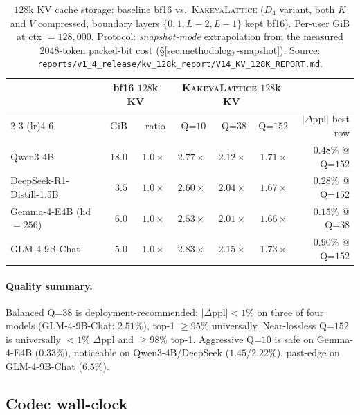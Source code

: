 \documentclass[10pt,a4paper]{article}
\theoremstyle{definition}
\theoremstyle{plain}
\newcommand{\abs}[1]{\left\lvert#1\right\rvert}
\begin{document}
\begin{table}[H]
\centering
\small
\caption{$128$k KV cache storage: baseline bf16 vs.\
\textsc{KakeyaLattice} ($D_4$ variant, both $K$ and $V$
compressed, boundary layers $\{0,1,L{-}2,L{-}1\}$ kept bf16).
Per-user GiB at ctx $=128{,}000$. Protocol: \emph{snapshot-mode}
extrapolation from the measured $2048$-token packed-bit cost
(\S\ref{sec:methodology-snapshot}). Source:
\texttt{reports/v1\_4\_release/kv\_128k\_report/V14\_KV\_128K\_REPORT.md}.}
\label{tab:128k}
\begin{tabular}{lrrrrrr}
  \toprule
   & \multicolumn{2}{c}{bf16 $128$k KV} & \multicolumn{3}{c}{\textsc{KakeyaLattice} $128$k KV} & \\
  \cmidrule(lr){2-3} \cmidrule(lr){4-6}
   & GiB & ratio & Q=$10$ & Q=$38$ & Q=$152$ & $\abs{\Delta\text{ppl}}$ best row \\
  \midrule
  Qwen3-4B                       & $18.0$ & $1.0\times$ & $2.77\times$ & $2.12\times$ & $1.71\times$ & $0.48\%$ @ Q=$152$ \\
  DeepSeek-R1-Distill-1.5B        & $ 3.5$ & $1.0\times$ & $2.60\times$ & $2.04\times$ & $1.67\times$ & $0.28\%$ @ Q=$152$ \\
  Gemma-4-E4B (hd $=\!256$)      & $ 6.0$ & $1.0\times$ & $2.53\times$ & $2.01\times$ & $1.66\times$ & $0.15\%$ @ Q=$38$  \\
  GLM-4-9B-Chat                  & $ 5.0$ & $1.0\times$ & $2.83\times$ & $2.15\times$ & $1.73\times$ & $0.90\%$ @ Q=$152$ \\
  \bottomrule
\end{tabular}
\end{table}

\paragraph{Quality summary.}
Balanced Q=$38$ is deployment-recommended: $|\Delta\text{ppl}| < 1\%$
on three of four models (GLM-4-9B-Chat: $2.51\%$), top-1
$\geq 95\%$ universally. Near-lossless Q=$152$ is universally
$<1\%$ $\Delta$ppl and $\geq 98\%$ top-1. Aggressive Q=$10$ is
safe on Gemma-4-E4B ($0.33\%$), noticeable on Qwen3-4B/DeepSeek
($1.45$/$2.22\%$), past-edge on GLM-4-9B-Chat ($6.5\%$).

\subsection{Codec wall-clock}
\end{document}
